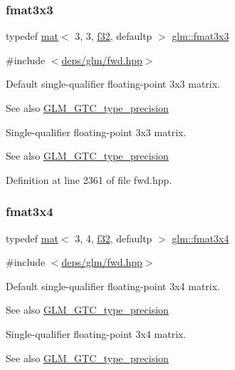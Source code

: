 \subsubsection{\texorpdfstring{fmat3x3}{fmat3x3}}
{\footnotesize\ttfamily typedef \hyperlink{structglm_1_1mat}{mat}$<$ 3, 3, \hyperlink{group__gtc__type__precision_ga0ec999b57f5330d9021256e96038df04}{f32}, defaultp $>$ \hyperlink{group__gtc__type__precision_ga5bf6f06e3cac1ed82489f858a0816aaa}{glm\+::fmat3x3}}



{\ttfamily \#include $<$\hyperlink{fwd_8hpp}{deps/glm/fwd.\+hpp}$>$}

Default single-\/qualifier floating-\/point 3x3 matrix. \begin{DoxySeeAlso}{See also}
\hyperlink{group__gtc__type__precision}{G\+L\+M\+\_\+\+G\+T\+C\+\_\+type\+\_\+precision}
\end{DoxySeeAlso}
Single-\/qualifier floating-\/point 3x3 matrix. \begin{DoxySeeAlso}{See also}
\hyperlink{group__gtc__type__precision}{G\+L\+M\+\_\+\+G\+T\+C\+\_\+type\+\_\+precision} 
\end{DoxySeeAlso}


Definition at line 2361 of file fwd.\+hpp.

\mbox{\label{group__gtc__type__precision_gab2daf8468a8b9343c065816df07e29fe}} 
\subsubsection{\texorpdfstring{fmat3x4}{fmat3x4}}
{\footnotesize\ttfamily typedef \hyperlink{structglm_1_1mat}{mat}$<$ 3, 4, \hyperlink{group__gtc__type__precision_ga0ec999b57f5330d9021256e96038df04}{f32}, defaultp $>$ \hyperlink{group__gtc__type__precision_gab2daf8468a8b9343c065816df07e29fe}{glm\+::fmat3x4}}



{\ttfamily \#include $<$\hyperlink{fwd_8hpp}{deps/glm/fwd.\+hpp}$>$}

Default single-\/qualifier floating-\/point 3x4 matrix. \begin{DoxySeeAlso}{See also}
\hyperlink{group__gtc__type__precision}{G\+L\+M\+\_\+\+G\+T\+C\+\_\+type\+\_\+precision}
\end{DoxySeeAlso}
Single-\/qualifier floating-\/point 3x4 matrix. \begin{DoxySeeAlso}{See also}
\hyperlink{group__gtc__type__precision}{G\+L\+M\+\_\+\+G\+T\+C\+\_\+type\+\_\+precision} 
\end{DoxySeeAlso}


